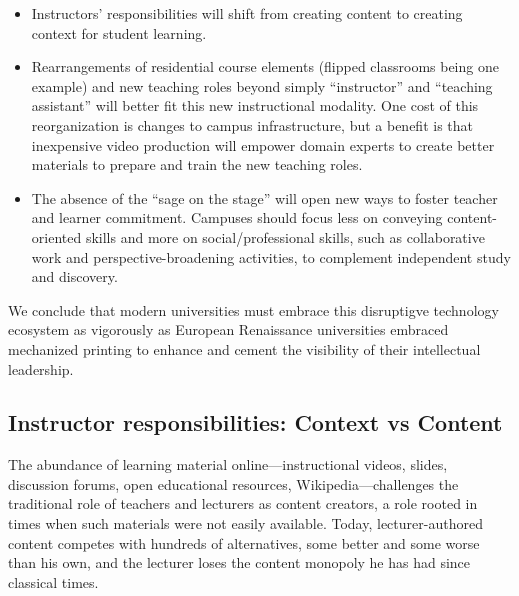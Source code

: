 \begin{itemize}

\item Instructors' responsibilities will shift from creating content to
  creating context for student learning.

\item Rearrangements of residential course elements (flipped classrooms
  being one example) and new teaching roles beyond simply ``instructor''
  and ``teaching assistant'' will better fit this new instructional
  modality.  One cost of this reorganization is changes to campus
  infrastructure, but a benefit is that inexpensive video production
  will empower domain experts to create 
  better materials to prepare and train the new teaching roles.

\item The absence of the ``sage on the stage'' will open new ways to
foster teacher and learner commitment.  Campuses should
focus less on conveying content-oriented skills and more on
social/professional skills, such as collaborative work and
perspective-broadening activities, to complement  independent study
and discovery.

\end{itemize} 

We conclude that modern universities must embrace this disruptigve
technology ecosystem as vigorously as European Renaissance universities
embraced mechanized printing to enhance and cement the
visibility of their intellectual leadership.


\subsection{Instructor responsibilities: Context vs Content}

The abundance of learning material online---instructional videos,
slides, discussion forums, open educational resources,
Wikipedia---challenges the traditional role of teachers and lecturers as
content creators, a role rooted in times when such materials were not
easily available.
Today, lecturer-authored content competes with hundreds of alternatives,
some better and some worse than his own, and the lecturer
loses the content monopoly he has had since classical times.

